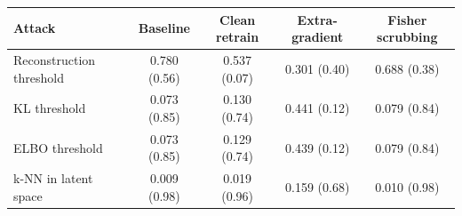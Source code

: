\begin{tabular}{lcccc}
\toprule
Attack & Baseline & Clean retrain & Extra-gradient & Fisher scrubbing \\
\midrule
Reconstruction threshold & 0.780 (0.56) & 0.537 (0.07) & 0.301 (0.40) & 0.688 (0.38) \\
KL threshold & 0.073 (0.85) & 0.130 (0.74) & 0.441 (0.12) & 0.079 (0.84) \\
ELBO threshold & 0.073 (0.85) & 0.129 (0.74) & 0.439 (0.12) & 0.079 (0.84) \\
k-NN in latent space & 0.009 (0.98) & 0.019 (0.96) & 0.159 (0.68) & 0.010 (0.98) \\
\bottomrule
\end{tabular}
